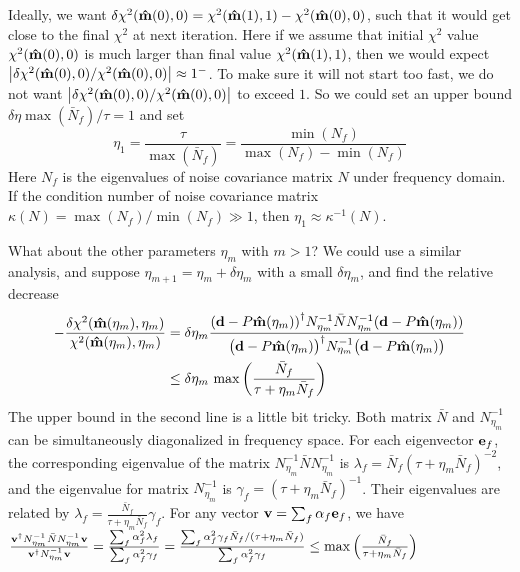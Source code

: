 \documentclass[11pt, letterpaper]{article}
\newcommand{\vbd}{\vb{d}}
\newcommand{\inv}[1]{#1^{-1}}
\newcommand{\hatm}{\vb{\hat{m}}}
\newcommand{\Nbar}{\bar{N}}
\begin{document}
Ideally, we want
$\delta \chi^2(\hatm(0),0) = \chi^2(\hatm(1), 1) - \chi^2(\hatm(0),0)$,
such that it would get close to the final $\chi^2$ at next iteration.
Here if we assume that initial $\chi^2$ value $\chi^2(\hatm(0),0)$ is much
larger than final value $\chi^2(\hatm(1),1)$,
then we would expect
$\qty|\delta\chi^2(\hatm(0),0)/\chi^2(\hatm(0),0)| \approx 1^-$.
To make sure it will not start too fast, we do not want 
$\qty|\delta\chi^2(\hatm(0),0)/\chi^2(\hatm(0),0)|$ 
to exceed $1$.
So we could set an upper bound $\delta \eta \max(\Nbar_f) / \tau = 1$
and set
\begin{equation}
\eta_1 = \frac{\tau}{\max(\Nbar_f)} = \frac{\min(N_f)}{\max(N_f) - \min(N_f)}
\end{equation}
Here $N_f$ is the eigenvalues of noise covariance matrix $N$ under frequency
domain.
If the condition number of noise covariance matrix
$\kappa(N) = \max(N_f)/\min(N_f) \gg 1$,
then $\eta_1 \approx \inv{\kappa} (N)$.

What about the other parameters $\eta_m$ with $m > 1$?
We could use a similar analysis,
and suppose $\eta_{m+1} = \eta_m + \delta \eta_m$ with a small $\delta\eta_m$,
and find the relative decrease
\begin{align}
\begin{aligned}[b]
-\frac{\delta \chi^2(\hatm(\eta_m), \eta_m)}{\chi^2(\hatm(\eta_m), \eta_m)}  
&= \delta\eta_m
\frac{\qty(\vbd - P\hatm(\eta_m))^{\dagger}
    \inv{N_{\eta_m}} \Nbar \inv{N_{\eta_m}}
    (\vbd - P\hatm(\eta_m))
}
{\qty\big(\vbd - P \hatm(\eta_m))^{\dagger}
    \inv{N_{\eta_m}}
    \qty\big(\vbd - P\hatm(\eta_m))
}
\\
& \leq \delta \eta_m\, \max\qty(\frac{\Nbar_f}{\tau + \eta_m \Nbar_f})
\label{eta upper bound}
\end{aligned}
\end{align}
The upper bound in the second line is a little bit tricky.
Both matrix $\Nbar$ and $\inv{N}_{\eta_m}$ 
can be simultaneously diagonalized in frequency space.
For each eigenvector $\vb{e}_f$,
the corresponding eigenvalue of the matrix 
$\inv{N}_{\eta_m} \Nbar \inv{N}_{\eta_m}$
is
$\lambda_f = \Nbar_f (\tau + \eta_m \Nbar_f)^{-2}$,
and the eigenvalue for matrix 
$\inv{N}_{\eta_m}$
is
$\gamma_f = (\tau + \eta_m \Nbar_f)^{-1}$.
Their eigenvalues are related by
$\lambda_f = \frac{\Nbar_f}{\tau + \eta_m \Nbar_f} \gamma_f$.
For any vector $\vb{v} = \sum_f \alpha_f \vb{e}_f$, we have
$\frac{\vb{v}^{\dagger} \inv{N}_{\eta_m} \Nbar \inv{N}_{\eta_m} \vb{v}}
{\vb{v}^{\dagger} \inv{N}_{\eta_m} \vb{v}}
= \frac{\sum_f \alpha_f^2 \lambda_f}{\sum_f \alpha_f^2 \gamma_f}
= \frac{\sum_f \alpha_f^2 \gamma_f \Nbar_f/(\tau + \eta_m \Nbar_f)}
{\sum_f \alpha_f^2 \gamma_f}
\leq \max \qty( \frac{\Nbar_f}{\tau + \eta_m \Nbar_f})
$
\end{document}
